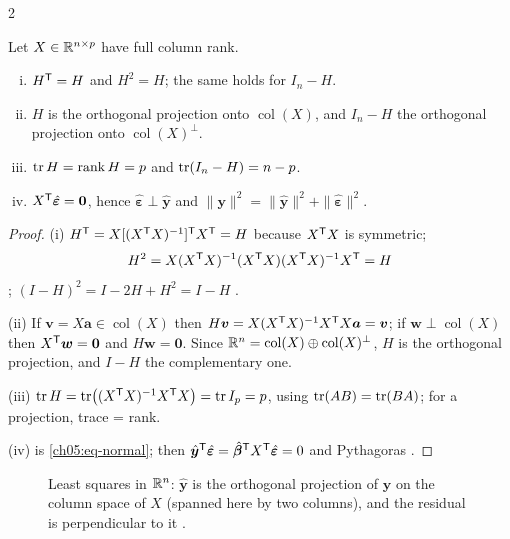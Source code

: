 \begin{paracol}{2}
\begin{proposition}\label{ch05:prop-hat}
Let $X\in\mathbb{R}^{n\times p}$ have full column rank.
\begin{enumerate}[(i)]
  \item $H^{\mathsf T}=H$ and $H^2=H$; the same holds for $I_n-H$.
  \item $H$ is the orthogonal projection onto $\operatorname{col}(X)$, and $I_n-H$ the orthogonal projection
        onto $\operatorname{col}(X)^\perp$.
  \item $\operatorname{tr} H=\operatorname{rank} H=p$ and $\operatorname{tr}(I_n-H)=n-p$.
  \item $X^{\mathsf T}\hat{\bm\varepsilon}=\bm 0$, hence $\hat{\bm\varepsilon}\perp\hat{\bm y}$ and
        $\|\bm y\|^2=\|\hat{\bm y}\|^2+\|\hat{\bm\varepsilon}\|^2$.
\end{enumerate}
\end{proposition}
\begin{proof}
(i) $H^{\mathsf T}=X[(X^{\mathsf T} X)^{-1}]^{\mathsf T} X^{\mathsf T}=H$ because $X^{\mathsf T} X$ is symmetric;
\[H^2=X(X^{\mathsf T} X)^{-1}(X^{\mathsf T} X)(X^{\mathsf T} X)^{-1}X^{\mathsf T}=H\]
; $(I-H)^2=I-2H+H^2=I-H$ .

(ii) If $\bm v=X\bm a\in\operatorname{col}(X)$ then $H\bm v=X(X^{\mathsf T} X)^{-1}X^{\mathsf T} X\bm a=\bm v$; if $\bm w\perp\operatorname{col}(X)$ then
$X^{\mathsf T}\bm w=\bm 0$ and $H\bm w=\bm 0$. Since $\mathbb{R}^n=\operatorname{col}(X)\oplus\operatorname{col}(X)^\perp$, $H$ is the orthogonal
projection, and $I-H$ the complementary one.

(iii) $\operatorname{tr} H=\operatorname{tr}\bigl((X^{\mathsf T} X)^{-1}X^{\mathsf T} X\bigr)=\operatorname{tr} I_p=p$, using $\operatorname{tr}(AB)=\operatorname{tr}(BA)$; for a projection, trace = rank.

(iv) is \eqref{ch05:eq-normal}; then $\hat{\bm y}^{\mathsf T}\hat{\bm\varepsilon}=\hat{\bm\beta}^{\mathsf T} X^{\mathsf T}\hat{\bm\varepsilon}=0$ and Pythagoras
.
\end{proof}

\begin{figure}[ht]
\centering
{}
\caption{Least squares in $\mathbb{R}^n$: $\hat{\bm y}$ is the orthogonal projection of $\bm y$ on the column space of
$X$ (spanned here by two columns), and the residual is perpendicular to it
 .}\label{ch05:fig-geometry}
\end{figure}


\end{paracol}
